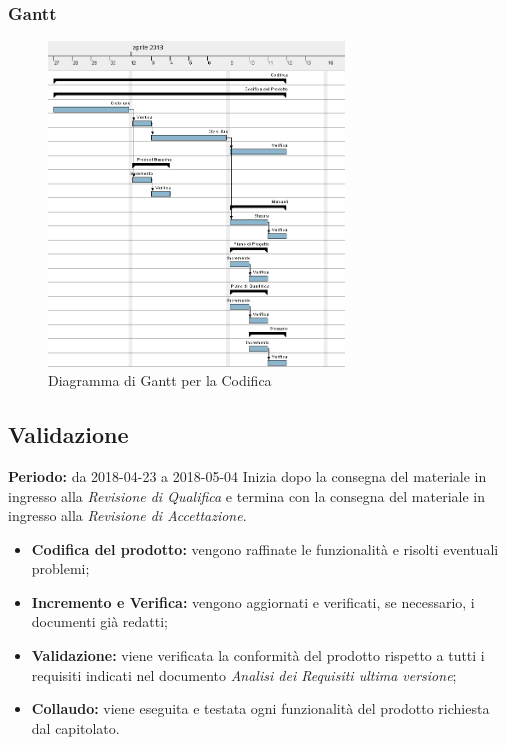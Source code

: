 \subsubsection{Gantt}
\begin{figure}[H]
	\centering 
	\includegraphics[width=0.7\textwidth]{images/Codifica.png}
	\caption{Diagramma di Gantt per la Codifica}
	\label{graficobello5} 
\end{figure}
\subsection{Validazione}
    \textbf{Periodo:} da 2018-04-23 a 2018-05-04\Spazio
    Inizia dopo la consegna del materiale in ingresso alla \emph{Revisione di Qualifica} e termina con la consegna del materiale in ingresso alla \emph{Revisione di Accettazione}.
    \begin{itemize}
    	\item \textbf{Codifica del prodotto:} vengono raffinate le funzionalità e risolti eventuali problemi;
    	\item \textbf{Incremento e Verifica:} vengono aggiornati e verificati, se necessario, i documenti già redatti; 
    	\item \textbf{Validazione:} viene verificata la conformità del prodotto rispetto a tutti i requisiti indicati nel documento \emph{Analisi dei Requisiti ultima versione};
    	\item \textbf{Collaudo:} viene eseguita e testata ogni funzionalità del prodotto richiesta dal capitolato.
    \end{itemize}
